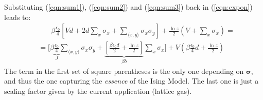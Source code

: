 \documentclass[../../main.tex]{subfiles}
\begin{document}
\medskip

Substituting (\ref{eqn:sum1}), (\ref{eqn:sum2}) and (\ref{eqn:sum3}) back in (\ref{eqn:expon}) leads to:
\begin{align}\nonumber
    &\phantom{=\>\>}\beta \frac{\epsilon_0}{4} \left[Vd + 2d \sum_x \sigma_x + \sum_{\langle x,y \rangle} \sigma_x \sigma_y\right]  + \frac{\ln z}{2} \left(V + \sum_x \sigma_x\right) =\\ \label{eqn:exponen2}
    &=\Bigg[\beta \underbrace{\frac{\epsilon_0}{4}}_{J} \sum_{\langle x,y \rangle} \sigma_x \sigma_y + \underbrace{\left[\frac{\beta \epsilon_0 d}{2}  + \frac{\ln z}{2} \right]}_{\beta b}  \sum_x \sigma_x \Bigg] + V\left( \beta \frac{\epsilon_0}{4} d +\frac{\ln z}{2} \right)
\end{align}
The term in the first set of square parentheses is the only one depending on $\bm{\sigma}$, and thus the one capturing the \textit{essence} of the Ising Model. The last one is just a scaling factor given by the current application (lattice gas).

\medskip
\end{document}

